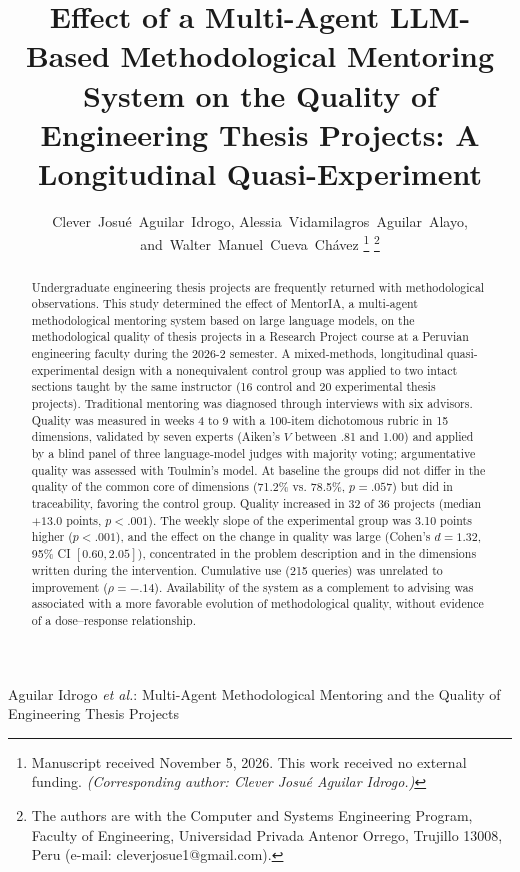 \documentclass[journal]{IEEEtran}
\begin{document}
\title{Effect of a Multi-Agent LLM-Based Methodological Mentoring System on the Quality of Engineering Thesis Projects: A Longitudinal Quasi-Experiment}

\author{Clever~Josu\'e~Aguilar~Idrogo,
        Alessia~Vidamilagros~Aguilar~Alayo,
        and~Walter~Manuel~Cueva~Ch\'avez%
\thanks{Manuscript received November 5, 2026. This work received no external funding. \textit{(Corresponding author: Clever Josu\'e Aguilar Idrogo.)}}%
\thanks{The authors are with the Computer and Systems Engineering Program, Faculty of Engineering, Universidad Privada Antenor Orrego, Trujillo 13008, Peru (e-mail: cleverjosue1@gmail.com).}}

%
{Aguilar Idrogo \MakeLowercase{\textit{et al.}}: Multi-Agent Methodological Mentoring and the Quality of Engineering Thesis Projects}

\maketitle

\begin{abstract}
Undergraduate engineering thesis projects are frequently returned with methodological observations. This study determined the effect of MentorIA, a multi-agent methodological mentoring system based on large language models, on the methodological quality of thesis projects in a Research Project course at a Peruvian engineering faculty during the 2026-2 semester. A mixed-methods, longitudinal quasi-experimental design with a nonequivalent control group was applied to two intact sections taught by the same instructor (16 control and 20 experimental thesis projects). Traditional mentoring was diagnosed through interviews with six advisors. Quality was measured in weeks 4 to 9 with a 100-item dichotomous rubric in 15 dimensions, validated by seven experts (Aiken's $V$ between .81 and 1.00) and applied by a blind panel of three language-model judges with majority voting; argumentative quality was assessed with Toulmin's model. At baseline the groups did not differ in the quality of the common core of dimensions (71.2\% vs. 78.5\%, $p = .057$) but did in traceability, favoring the control group. Quality increased in 32 of 36 projects (median $+13.0$ points, $p < .001$). The weekly slope of the experimental group was 3.10 points higher ($p < .001$), and the effect on the change in quality was large (Cohen's $d = 1.32$, 95\% CI $[0.60, 2.05]$), concentrated in the problem description and in the dimensions written during the intervention. Cumulative use (215 queries) was unrelated to improvement ($\rho = -.14$). Availability of the system as a complement to advising was associated with a more favorable evolution of methodological quality, without evidence of a dose--response relationship.
\end{abstract}
\end{document}
